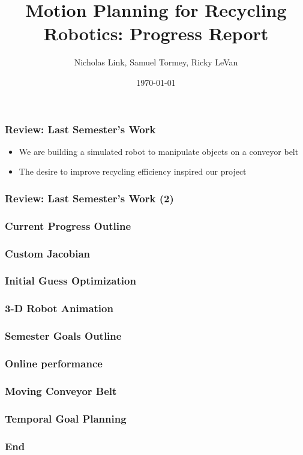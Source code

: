 \documentclass{beamer}
\title[Recycle Robot]{Motion Planning for Recycling Robotics: Progress Report} %
\author[Link, Tormey, LeVan]{Nicholas Link, Samuel Tormey, Ricky LeVan} %
\date{\today} %
\begin{document}
\begin{frame}
\titlepage %

\end{frame}

\begin{frame}
\frametitle{Review: Last Semester's Work}

\begin{itemize}
\item We are building a simulated robot to manipulate objects on a conveyor belt
\item The desire to improve recycling efficiency inspired our project
\end{itemize}



\end{frame}


\begin{frame}
\frametitle{Review: Last Semester's Work (2)}

\end{frame}



\begin{frame}
\frametitle{Current Progress Outline}

\end{frame}



\begin{frame}
\frametitle{Custom Jacobian}

\end{frame}




\begin{frame}
\frametitle{Initial Guess Optimization}

\end{frame}


\begin{frame}
\frametitle{3-D Robot Animation}

\end{frame}


\begin{frame}
\frametitle{Semester Goals Outline}

\end{frame}


\begin{frame}
\frametitle{Online performance}

\end{frame}


\begin{frame}
\frametitle{Moving Conveyor Belt}

\end{frame}


\begin{frame}
\frametitle{Temporal Goal Planning}

\end{frame}

\begin{frame}
\frametitle{End}

\end{frame}
\end{document}
